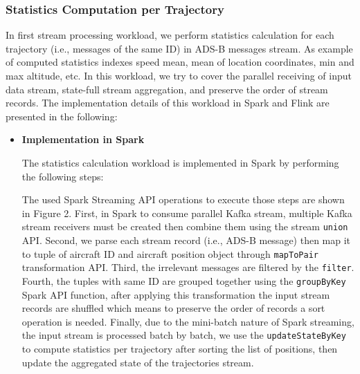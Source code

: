 \documentclass[]{article}
\begin{document}
\subsubsection{Statistics Computation per Trajectory}
In first stream processing workload, we perform statistics calculation for each trajectory (i.e.,  messages of the same ID) in ADS-B messages stream. As example of computed statistics indexes speed mean, mean of location coordinates, min and max altitude, etc. In this workload, we try to cover 
the parallel receiving of input data stream, state-full stream aggregation, and preserve the order of stream records.
The implementation details of this workload in Spark and Flink are presented in the following: 
\begin{itemize}
\item {\bf{Implementation in Spark }}

The statistics calculation workload is implemented in Spark by performing the following steps: 

\par The used Spark Streaming API operations to execute those steps are shown in Figure 2. First, in Spark to consume parallel Kafka stream, multiple Kafka stream receivers must be created then combine them using the stream \texttt{union} API. Second, we parse each stream record (i.e., ADS-B message) then map it to tuple of aircraft ID and aircraft position object through \texttt{mapToPair} transformation API. Third, the irrelevant messages are filtered by the \texttt{filter}. Fourth, the tuples with same ID are grouped together using the \texttt{groupByKey} Spark API function, after applying this transformation the input stream records are shuffled which means to preserve the order of records a sort operation is needed. Finally, due to the mini-batch nature of Spark streaming, the input stream is processed batch by batch, we use the  \texttt{updateStateByKey} to compute statistics per trajectory after sorting the list of positions, then update the aggregated state of the trajectories stream.


\end{itemize}
\end{document}
